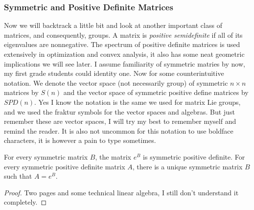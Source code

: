 \subsubsection{Symmetric and Positive Definite Matrices}
Now we will backtrack a little bit and look at another important class of matrices,
and consequently, groups. A matrix is \textit{positive semidefinite} if all of its
eigenvalues are nonnegative. The spectrum of positive definite matrices is used
extensively in optimization and convex analysis, it also has some neat geometric
implications we will see later. I assume familiarity of symmetric matries by now,
my first grade students could identity one. Now for some counterintuitive notation.
We denote the vector space (not necessarily group) of symmetric $n\times n$ matrices by $S(n)$
and the vector space of symmetric positive define matrices by $SPD(n)$. Yes I know
the notation is the same we used for matrix Lie groups, and we used the fraktur symbols for
the vector spaces and algebras. But just remember these are vector spaces, I will
try my best to remember myself and remind the reader. It is also not uncommon for
this notation to use boldface characters, it is however a pain to type sometimes.

\begin{boxprop}{}{}
    For every symmetric matrix $B$, the matrix $e^B$ is symmetric positive definite.
    For every symmetric positive definite matrix $A$, there is a unique symmetric
    matrix $B$ such that $A=e^B$.
    \begin{proof}
        Two pages and some technical linear algebra, I still don't understand it
        completely. 
    \end{proof}
\end{boxprop}





